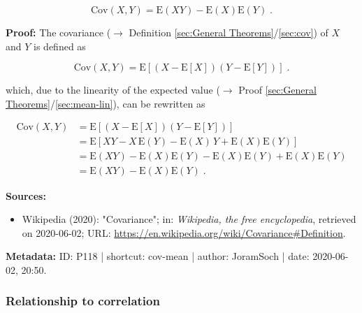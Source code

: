 \documentclass[a4paper,12pt,twoside]{book}
\begin{document}
\begin{equation} \label{eq:cov-mean-cov-mean}
\mathrm{Cov}(X,Y) = \mathrm{E}(X Y) - \mathrm{E}(X) \mathrm{E}(Y) \; .
\end{equation}


\vspace{1em}
\textbf{Proof:} The covariance ($\rightarrow$ Definition \ref{sec:General Theorems}/\ref{sec:cov}) of $X$ and $Y$ is defined as

\begin{equation} \label{eq:cov-mean-cov}
\mathrm{Cov}(X,Y) = \mathrm{E}\left[ (X-\mathrm{E}[X]) (Y-\mathrm{E}[Y]) \right] \; .
\end{equation}

which, due to the linearity of the expected value ($\rightarrow$ Proof \ref{sec:General Theorems}/\ref{sec:mean-lin}), can be rewritten as

\begin{equation} \label{eq:cov-mean-cov-mean-qed}
\begin{split}
\mathrm{Cov}(X,Y) &= \mathrm{E}\left[ (X-\mathrm{E}[X]) (Y-\mathrm{E}[Y]) \right] \\
&= \mathrm{E}\left[ X Y - X \, \mathrm{E}(Y) - \mathrm{E}(X) \, Y + \mathrm{E}(X) \mathrm{E}(Y) \right] \\
&= \mathrm{E}(X Y) - \mathrm{E}(X) \mathrm{E}(Y) - \mathrm{E}(X) \mathrm{E}(Y) + \mathrm{E}(X) \mathrm{E}(Y) \\
&= \mathrm{E}(X Y) - \mathrm{E}(X) \mathrm{E}(Y) \; .
\end{split}
\end{equation}


\vspace{1em}
\textbf{Sources:}
\begin{itemize}
\item Wikipedia (2020): "Covariance"; in: \textit{Wikipedia, the free encyclopedia}, retrieved on 2020-06-02; URL: \url{https://en.wikipedia.org/wiki/Covariance#Definition}.
\end{itemize}


\vspace{1em}
\textbf{Metadata:} ID: P118 | shortcut: cov-mean | author: JoramSoch | date: 2020-06-02, 20:50.
\vspace{1em}



\subsubsection[\textbf{Relationship to correlation}]{Relationship to correlation} \label{sec:cov-corr}
\setcounter{equation}{0}
\end{document}
